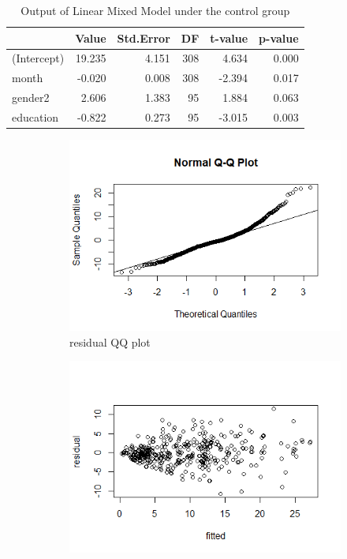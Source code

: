 \begin{table}[H]
\centering
\begin{tabular}{|l|r|r|r|r|r|}
\hline
  & Value & Std.Error & DF & t-value & p-value\\
\hline
(Intercept) & 19.235 & 4.151 & 308 & 4.634 & 0.000\\
\hline
month & -0.020 & 0.008 & 308 & -2.394 & 0.017\\
\hline
gender2 & 2.606 & 1.383 & 95 & 1.884 & 0.063\\
\hline
education & -0.822 & 0.273 & 95 & -3.015 & 0.003\\
\hline
\end{tabular}
\caption{Output of Linear Mixed Model under the control group}
\label{tab:lme.control}
\end{table}

\begin{figure}[H]
\begin{subfigure}{.5\textwidth}
  \centering
  \includegraphics[width=1\linewidth]{../../plots/qq_residual_control.png}
  \caption{residual QQ plot}
\end{subfigure}
\begin{subfigure}{.5\textwidth}
  \centering
  \includegraphics[width=1\linewidth]{../../plots/residual_control.png}

\end{subfigure}
\end{figure}

